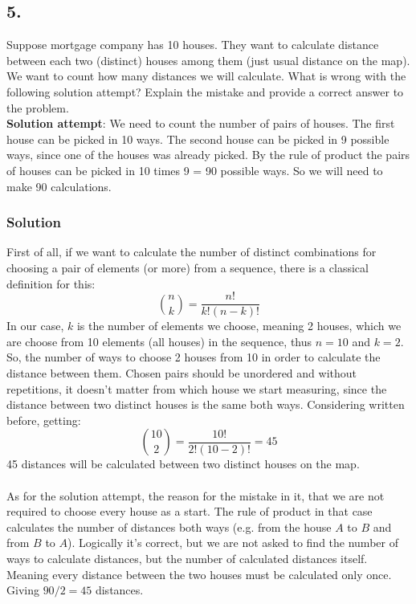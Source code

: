 \documentclass[a4paper]{article}
\newcommand{\lrl}[1]{\({#1}\)}
\begin{document}
\subsection*{5.} Suppose mortgage company has 10 houses. They want to calculate distance between each two (distinct) houses among them (just usual distance on the map). We want to count how many distances we will calculate. What is wrong with the following solution attempt? Explain the mistake and provide a correct answer to the problem. \\

\textbf{Solution attempt}: We need to count the number of pairs of houses. The first house can be picked in 10 ways. The second house can be picked in 9 possible ways, since one of the houses was already picked. By the rule of product the pairs of houses can be picked in 10 times 9 = 90 possible ways. So we will need to make 90 calculations.

\subsubsection*{Solution}
First of all, if we want to calculate the number of distinct combinations for choosing a pair of elements (or more) from a sequence, there is a classical definition for this:
\[\binom{n}{k} = \frac{n!}{k!(n-k)!}\]
In our case, \lrl{k} is the number of elements we choose, meaning 2 houses, which we are choose from 10 elements (all houses) in the sequence, thus \lrl{n = 10} and \lrl{k = 2}. So, the number of ways to choose 2 houses from 10 in order to calculate the distance between them. Chosen pairs should be unordered and without repetitions, it doesn't matter from which house we start measuring, since the distance between two distinct houses is the same both ways. Considering written before, getting:
\[\binom{10}{2} = \frac{10!}{2!(10-2)!} = 45\]
45 distances will be calculated between two distinct houses on the map.\\\\
As for the solution attempt, the reason for the mistake in it, that we are not required to choose every house as a start. The rule of product in that case calculates the number of distances both ways (e.g. from the house \lrl{A} to \lrl{B} and from \lrl{B} to \lrl{A}). Logically it's correct, but we are not asked to find the number of ways to calculate distances, but the number of calculated distances itself. Meaning every distance between the two houses must be calculated only once. Giving \(90 / 2 = 45\) distances.
\end{document}
